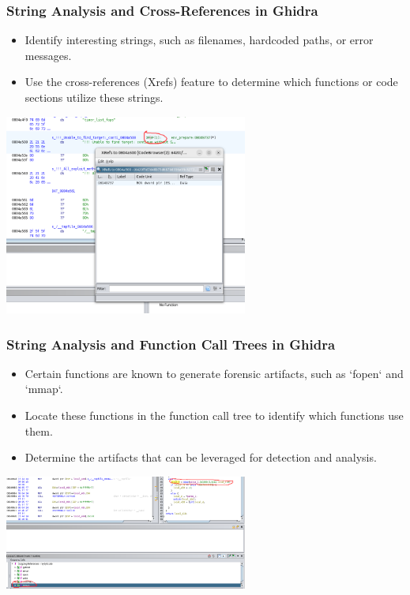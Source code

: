 \begin{frame}
\frametitle{String Analysis and Cross-References in Ghidra}

\begin{itemize}
    \item Identify interesting strings, such as filenames, hardcoded paths, or error messages.
    \item Use the cross-references (Xrefs) feature to determine which functions or code sections utilize these strings.
\end{itemize}

\centering
\includegraphics[width=0.6\textwidth]{img/gxref.png}
\end{frame}


\begin{frame}
\frametitle{String Analysis and Function Call Trees in Ghidra}

\begin{itemize}
    \item Certain functions are known to generate forensic artifacts, such as `fopen` and `mmap`.
    \item Locate these functions in the function call tree to identify which functions use them.
    \item Determine the artifacts that can be leveraged for detection and analysis.
\end{itemize}

\centering
\includegraphics[width=0.6\textwidth]{img/goutcall.png}
\end{frame}



